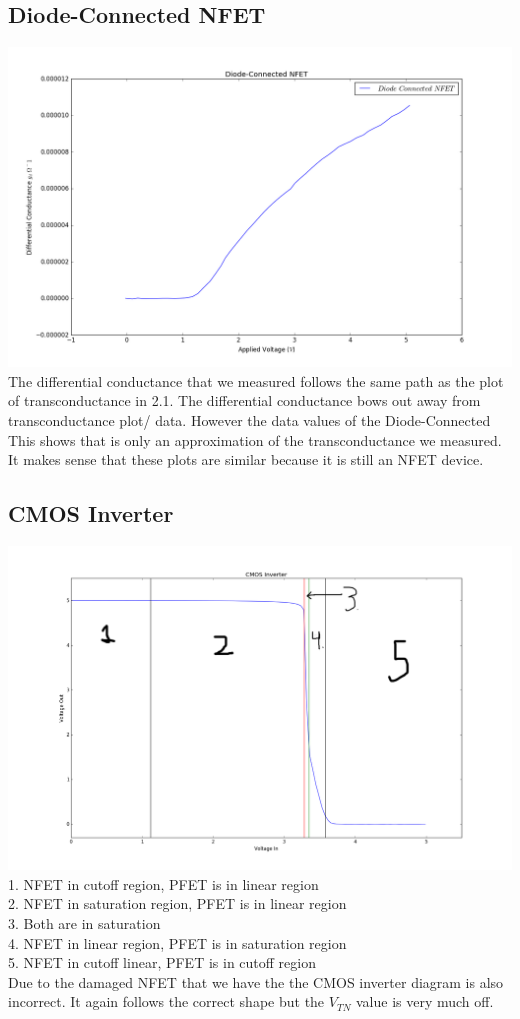 \documentclass[12pt, oneside]{article}
\begin{document}
\subsection{Diode-Connected NFET}
	\includegraphics[scale=.4]{figure_1}\\

	The differential conductance that we measured follows the same path as the plot of transconductance in 2.1. The differential conductance bows out away from transconductance plot/ data. However the data values of the Diode-Connected This shows that is only an approximation of the transconductance we measured. It makes sense that these plots are similar because it is still an NFET device.

\subsection{CMOS Inverter}
\includegraphics[scale=.3]{inv}\\
1. NFET in cutoff region, PFET is in linear region\\
2. NFET in saturation region, PFET is in linear region\\
3. Both are in saturation\\
4. NFET in linear region, PFET is in saturation region\\
5. NFET in cutoff linear, PFET is in cutoff region\\

Due to the damaged NFET that we have the the CMOS inverter diagram is also incorrect. It again follows the correct shape but the $V_{TN}$ value is very much off.
\end{document}
